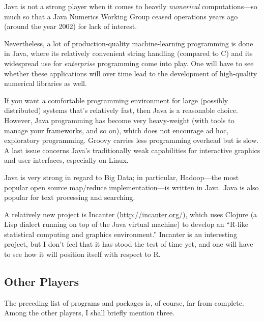 Java is not a strong player when it comes to heavily \emph{numerical}
computations---so much so that a Java Numerics Working Group ceased
operations years ago (around the year 2002) for lack of interest.

Nevertheless, a lot of production-quality machine-learning programming
is done in Java, where its relatively convenient string handling
(compared to C) and its widespread use for \emph{enterprise}
programming come into play.  One will have to see whether these
applications will over time lead to the development of high-quality
numerical libraries as well.

If you want a comfortable programming environment for large (possibly
distributed) systems that's relatively fast, then Java is a reasonable
choice. However, Java programming has become very heavy-weight (with
tools to manage your frameworks, and so on), which does not encourage
ad hoc, exploratory programming. Groovy carries less programming
overhead but is slow. A last issue concerns Java's traditionally weak
capabilities for interactive graphics and user interfaces, especially
on Linux.

Java is very strong in regard to Big Data; in particular, Hadoop---the
most popular open source map/reduce implementation---is written in
Java. Java is also popular for text processing and searching.

A relatively new project is Incanter (\url{http://incanter.org/}), which uses Clojure (a Lisp
dialect running on top of the Java virtual machine) to develop an
``R-like statistical computing and graphics environment.''  Incanter
is an interesting project, but I don't feel that it has stood the test
of time yet, and one will have to see how it will position itself with
respect to R.

%
%
%


\subsection{Other Players}

The preceding list of programs and packages is, of course, far from
complete. Among the other players, I shall briefly mention three.\pagebreak

